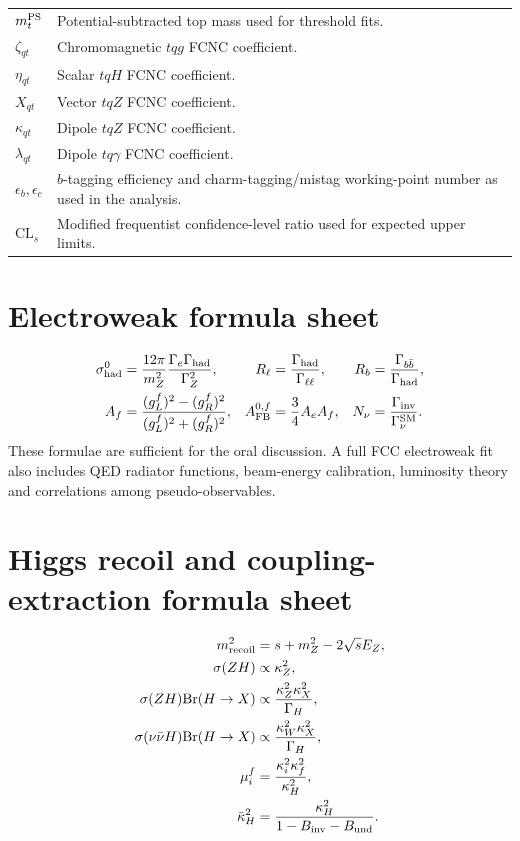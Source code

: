 \documentclass[11pt,a4paper]{report}
\newcommand{\br}{\mathrm{Br}}
\newcommand{\CLs}{\mathrm{CL}_s}
\begin{document}
\begin{longtable}{p{}p{}}
$m_t^{\rm PS}$ & Potential-subtracted top mass used for threshold fits. \\
$\zeta_{qt}$ & Chromomagnetic $tqg$ FCNC coefficient. \\
$\eta_{qt}$ & Scalar $tqH$ FCNC coefficient. \\
$X_{qt}$ & Vector $tqZ$ FCNC coefficient. \\
$\kappa_{qt}$ & Dipole $tqZ$ FCNC coefficient. \\
$\lambda_{qt}$ & Dipole $tq\gamma$ FCNC coefficient. \\
$\epsilon_b,\epsilon_c$ & $b$-tagging efficiency and charm-tagging/mistag working-point number as used in the analysis. \\
$\CLs$ & Modified frequentist confidence-level ratio used for expected upper limits. \\
\bottomrule
\end{longtable}

\chapter{Electroweak formula sheet}
\begin{align}
\sigma^0_{\rm had}&=\frac{12\pi}{m_Z^2}\frac{\Gamma_e\Gamma_{\rm had}}{\Gamma_Z^2},&
R_\ell&=\frac{\Gamma_{\rm had}}{\Gamma_{\ell\ell}},&
R_b&=\frac{\Gamma_{b\bar b}}{\Gamma_{\rm had}},\\
A_f&=\frac{(g_L^f)^2-(g_R^f)^2}{(g_L^f)^2+(g_R^f)^2},&
A_{\rm FB}^{0,f}&=\frac{3}{4}A_eA_f,&
N_\nu&=\frac{\Gamma_{\rm inv}}{\Gamma_\nu^{\rm SM}}.
\end{align}
These formulae are sufficient for the oral discussion.  A full FCC electroweak fit also includes QED radiator functions, beam-energy calibration, luminosity theory and correlations among pseudo-observables.

\chapter{Higgs recoil and coupling-extraction formula sheet}
\begin{align}
  m_{\rm recoil}^2&=s+m_Z^2-2\sqrt{s}E_Z,\\
  \sigma(ZH)&\propto \kappa_Z^2,\\
  \sigma(ZH)\br(H\to X)&\propto\frac{\kappa_Z^2\kappa_X^2}{\Gamma_H},\\
  \sigma(\nu\bar\nu H)\br(H\to X)&\propto\frac{\kappa_W^2\kappa_X^2}{\Gamma_H},\\
  \mu_i^f&=\frac{\kappa_i^2\kappa_f^2}{\kappa_H^2},\\
  \bar\kappa_H^2&=\frac{\kappa_H^2}{1-B_{\rm inv}-B_{\rm und}}.
\end{align}
\end{document}
